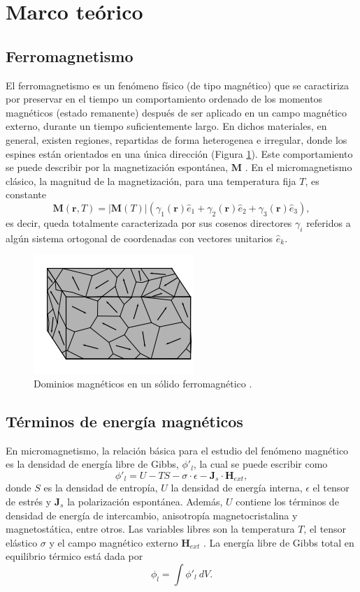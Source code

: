 \newpage
\section{Marco teórico}
\subsection{Ferromagnetismo}

El ferromagnetismo es un fenómeno físico (de tipo magnético) que se caractiriza por preservar en el tiempo un comportamiento ordenado de los momentos magnéticos (estado remanente) después de ser aplicado en un campo magnético externo, durante un tiempo suficientemente largo. En dichos materiales, en general, existen regiones, repartidas de forma heterogenea e irregular, donde los espines están orientados en una única dirección (Figura \ref{fig:MagneticDomain}). Este comportamiento se puede describir por la magnetización espontánea, $\mathbf{M}$ \cite{coey_2010}. En el micromagnetismo clásico, la magnitud de la magnetización, para una temperatura fija $T$, es constante \cite{Exl2020} \[ \mathbf{M} (\mathbf{r},T) = |\mathbf{M} (T)| (\gamma_1 (\mathbf{r}) \hat{e}_1 + \gamma_2 (\mathbf{r}) \hat{e}_2 + \gamma_3 (\mathbf{r}) \hat{e}_3 ), \]  es decir, queda totalmente caracterizada por sus cosenos directores $\gamma_i$ referidos a algún sistema ortogonal de coordenadas con vectores unitarios $\hat{e}_k$. 
\begin{figure}[!htp]
    \centering
    \includegraphics[scale=0.8]{Figuras/MagneticDomain.png}
    \renewcommand{\figurename}{\textbf{Figura}}
    \renewcommand\thefigure{\textbf{\arabic{figure}}}
    \caption{Dominios magnéticos en un sólido ferromagnético \cite{coey_2010}.}
    \label{fig:MagneticDomain}
\end{figure}
\subsection{Términos de energía magnéticos}
En micromagnetismo, la relación básica para el estudio del fenómeno magnético es la densidad de energía libre de Gibbs, $\phi'_l$, la cual se puede escribir como \[ \phi'_l = U - T S - \sigma \cdot \epsilon - \mathbf{J}_s \cdot \mathbf{H}_{ext},\] donde $S$ es la densidad de entropía, $U$ la densidad de energía interna, $\epsilon$ el tensor de estrés y $\mathbf{J}_s$ la polarización espontánea. Además, $U$ contiene los términos de densidad de energía de intercambio, anisotropía magnetocristalina y magnetostática, entre otros. Las variables libres son la temperatura $T$, el tensor elástico $\sigma$ y el campo magnético externo $\mathbf{H}_{ext}$ \cite{KronmüllerMicromagnetism,Exl2020}. La energía libre de Gibbs total en equilibrio térmico está dada por \[ \phi_l = \int \phi'_l ~ dV .\]
